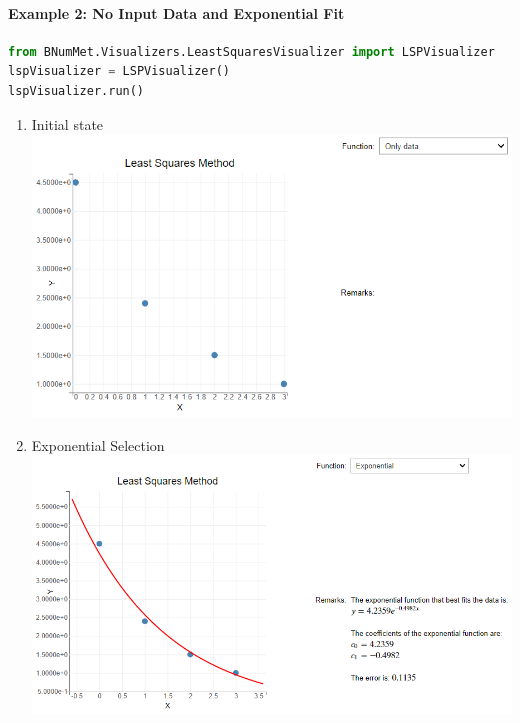 \paragraph{Example 2: No Input Data and Exponential Fit}
\begin{lstlisting}[language=Python]
from BNumMet.Visualizers.LeastSquaresVisualizer import LSPVisualizer
lspVisualizer = LSPVisualizer()
lspVisualizer.run()
\end{lstlisting}
\begin{enumerate}
    \item Initial state\\
    \includegraphics[scale=0.6]{Include/Images/Thesis/Documentation/Visualizers/LeastSquares/Example 2/Example 2 - 00 - Initial State.png}
    \item Exponential Selection\\
    \includegraphics[scale=0.6]{Include/Images/Thesis/Documentation/Visualizers/LeastSquares/Example 2/Example 2 - 00 - Exponential.png}
\end{enumerate}

